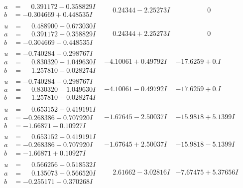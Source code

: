 \documentclass[1p]{elsarticle_modified}
\theoremstyle{definition}
\begin{document}
$$\begin{array}{c|c|c}
\begin{aligned}
a &= \phantom{-}0.391172 - 0.358829 I \\
b &= -0.304669 + 0.448535 I\end{aligned}
 & \phantom{-}0.24344 - 2.25273 I & \phantom{-0.000000 } 0 \\ \hline\begin{aligned}
u &= \phantom{-}0.488900 - 0.673030 I \\
a &= \phantom{-}0.391172 + 0.358829 I \\
b &= -0.304669 - 0.448535 I\end{aligned}
 & \phantom{-}0.24344 + 2.25273 I & \phantom{-0.000000 } 0 \\ \hline\begin{aligned}
u &= -0.740284 + 0.298767 I \\
a &= \phantom{-}0.830320 + 1.049630 I \\
b &= \phantom{-}1.257810 - 0.028274 I\end{aligned}
 & -4.10061 + 0.49792 I & -17.6259 + 0. I\phantom{ +0.000000I} \\ \hline\begin{aligned}
u &= -0.740284 - 0.298767 I \\
a &= \phantom{-}0.830320 - 1.049630 I \\
b &= \phantom{-}1.257810 + 0.028274 I\end{aligned}
 & -4.10061 - 0.49792 I & -17.6259 + 0. I\phantom{ +0.000000I} \\ \hline\begin{aligned}
u &= \phantom{-}0.653152 + 0.419191 I \\
a &= -0.268386 - 0.707920 I \\
b &= -1.66871 - 0.10927 I\end{aligned}
 & -1.67645 - 2.50037 I & -15.9818 + 5.1399 I \\ \hline\begin{aligned}
u &= \phantom{-}0.653152 - 0.419191 I \\
a &= -0.268386 + 0.707920 I \\
b &= -1.66871 + 0.10927 I\end{aligned}
 & -1.67645 + 2.50037 I & -15.9818 - 5.1399 I \\ \hline\begin{aligned}
u &= \phantom{-}0.566256 + 0.518532 I \\
a &= \phantom{-}0.135073 + 0.566520 I \\
b &= -0.255171 - 0.370268 I\end{aligned}
 & \phantom{-}2.61662 - 3.02816 I & -7.67475 + 5.37656 I \\ \hline\begin{aligned}

\end{aligned}
\end{array}$$
\end{document}
